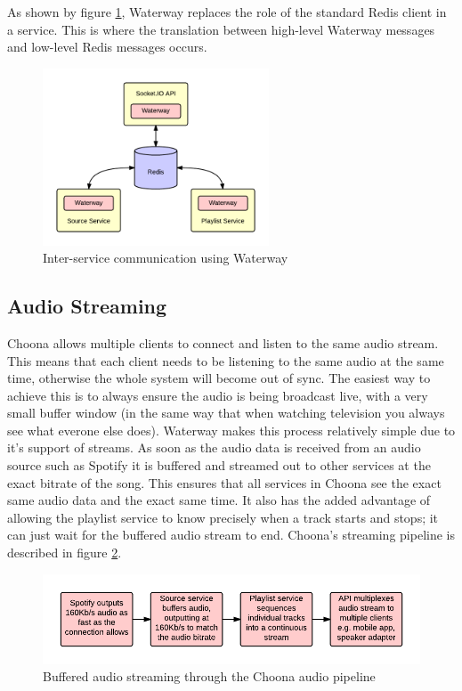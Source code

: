 As shown by figure \ref{fig:waterway-communication}, Waterway replaces the role of the standard Redis client in a service. This is where the translation between high-level Waterway messages and low-level Redis messages occurs.

\begin{figure}[h!]
  \centering
  \includegraphics[width=0.6\textwidth]{./img/waterway.png}
  \caption{Inter-service communication using Waterway}
  \label{fig:waterway-communication}
\end{figure}


\subsection{Audio Streaming}

Choona allows multiple clients to connect and listen to the same audio stream. This means that each client needs to be listening to the same audio at the same time, otherwise the whole system will become out of sync. The easiest way to achieve this is to always ensure the audio is being broadcast live, with a very small buffer window (in the same way that when watching television you always see what everone else does). Waterway makes this process relatively simple due to it's support of streams. As soon as the audio data is received from an audio source such as Spotify it is buffered and streamed out to other services at the exact bitrate of the song. This ensures that all services in Choona see the exact same audio data and the exact same time. It also has the added advantage of allowing the playlist service to know precisely when a track starts and stops; it can just wait for the buffered audio stream to end. Choona's streaming pipeline is described in figure \ref{fig:streaming}.

\begin{figure}[h!]
  \centering
  \includegraphics[width=1\textwidth]{./img/streaming.png}
  \caption{Buffered audio streaming through the Choona audio pipeline}
  \label{fig:streaming}
\end{figure}

